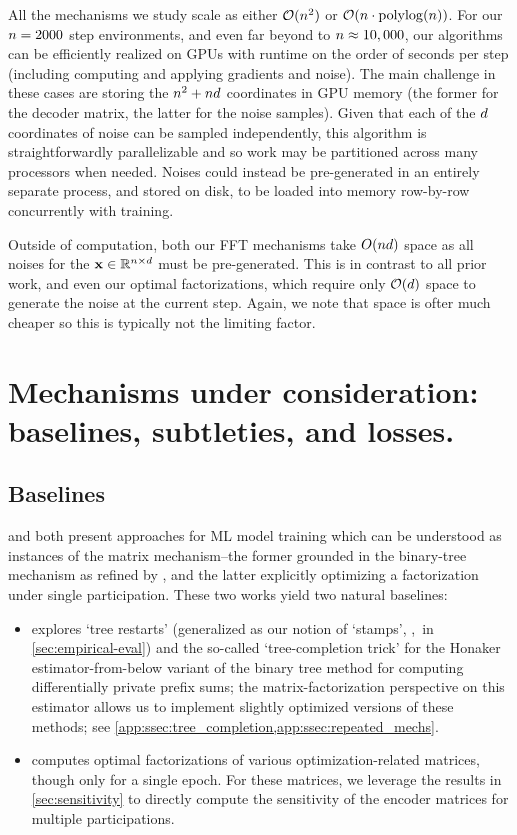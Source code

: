 \documentclass{article} %
\theoremstyle{named}
\begin{document}
All the mechanisms we study scale as either $\mathcal{O}(n^2)$ or $\mathcal{O}(n \cdot \operatorname{polylog}(n))$. For our $n=2000$ step environments, and even far beyond to $n\approx10,000$, our algorithms can be efficiently realized on GPUs with runtime on the order of seconds per step (including computing and applying gradients and noise). The main challenge in these cases are storing the $n^2 + nd$ coordinates in GPU memory (the former for the decoder matrix, the latter for the noise samples). Given that each of the $d$ coordinates of noise can be sampled independently, this algorithm is straightforwardly parallelizable and so work may be partitioned across many processors when needed. Noises could instead be pre-generated in an entirely separate process, and stored on disk, to be loaded into memory row-by-row concurrently with training.

Outside of computation, both our FFT mechanisms take $O(nd)$ space as all noises for the $\mathbf{x} \in \mathbb{R}^{n \times d}$ must be pre-generated. This is in contrast to all prior work, and even our optimal factorizations, which require only $\mathcal{O}(d)$ space to generate the noise at the current step. Again, we note that space is ofter much cheaper so this is typically not the limiting factor.

\section{Mechanisms under consideration: baselines, subtleties, and losses.}\label{app:mechanism_discussion}

\subsection{Baselines}\label{app:ssec:baselines}
\citet{kairouz2021practical} and \citet{denisov22matfact} both present approaches for ML model training which can be understood as instances of the matrix mechanism--the former grounded in the binary-tree mechanism as refined by \citet{honaker_trick}, and the latter explicitly optimizing a factorization under single participation. These two works yield two natural baselines:
\begin{itemize}
    \item \citet{kairouz2021practical} explores `tree restarts' (generalized as our notion of `stamps', \stamps,~in \cref{sec:empirical-eval}) and the so-called `tree-completion trick' for the Honaker estimator-from-below variant of the binary tree method for computing differentially private prefix sums; the matrix-factorization perspective on this estimator allows us to implement slightly optimized versions of these methods; see \cref{app:ssec:tree_completion,app:ssec:repeated_mechs}.
    \item \citet{denisov22matfact} computes optimal factorizations of various optimization-related matrices, though only for a single epoch. For these matrices, we leverage the results in \cref{sec:sensitivity} to directly compute the sensitivity of the encoder matrices for multiple participations.
\end{itemize}
\end{document}
